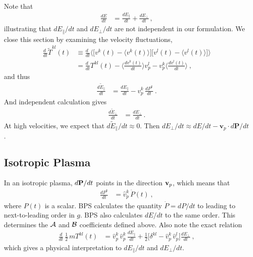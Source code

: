 \documentclass[preprint,12pt,eqsecnum,nofootinbib,amsmath,amssymb]{revtex4}
\begin{document}
Note that
\begin{align}
  \frac{d E}{dt} 
  &=\frac{d E_\parallel}{dt} + \frac{d E_\perp}{dt}
   \,,
\end{align}
illustrating that $dE_\parallel/dt$ and $dE_\perp/dt$ are
not independent in our formulation. 
We close this section by examining the velocity fluctuations,
\begin{align}
  \frac{d \,\,}{dt} \widetilde{T}^{kl}(t) 
  &\equiv
  \frac{d \,\,}{dt} \Big\langle \Big[v^k(t) - \langle v^k(t) \rangle \Big] 
  \Big[v^l(t) - \langle v^l(t) \rangle \Big] \Big\rangle 
  \nonumber\\
  &=
  \frac{d \,\,}{dt} T^{kl}(t) 
    - \Big\langle \frac{d v^k(t)}{dt} \Big\rangle v^l_p 
    -   v^k_p \Big\langle \frac{d v^l(t)}{dt} \Big\rangle 
\ ,
\end{align}
and thus
\begin{align}
\frac{d \widetilde{E}_\parallel}{dt} &= \frac{d E_\parallel}{dt} 
    - v^k_p\, \frac{d P^k}{dt} 
    \ .
\end{align}
And independent calculation gives
\begin{align} 
\frac{d \widetilde{E}_\perp}{dt} &= \frac{d E_\perp}{dt} \,.
\label{perp}
\end{align}
At high velocities, we expect that 
$d \widetilde{E}_\parallel / dt \approx 0$. Then
$d E_\perp / dt \approx dE/dt - \mathbf v_p \cdot d\mathbf P /dt$.


\subsection{Isotropic Plasma}

In an isotropic plasma, $d{\bf P}/dt$ points in the direction ${\bf v}_p$,
which means that
\begin{align}
\frac{d P^k}{dt}  &= \hat v^k_p\, \dot P(t) 
\ ,
\end{align}
where $P(t)$ is a scalar. BPS calculates the quantity $\dot P = dP/dt$ to
leading to next-to-leading order in $g$. BPS also calculates $dE/dt$ to
the same order. This determines the ${\cal A}$ and ${\cal B}$ coefficients
defined above. Also note the exact relation
\begin{align}
  \frac{d}{dt} \, \frac{1}{2}\, m T^{kl}(t) 
  &= 
  \hat v_p^k \,\hat v_p^k \, \frac{dE_\parallel}{dt} 
  + 
  \frac{1}{2} \Big[ \delta^{kl} - \hat v_p^k \, \hat v_p^l \Big] \frac{dE_\perp}{dt} 
  \ ,
\end{align}
which gives a physical interpretation to $dE_\parallel/dt$ and 
$dE_\perp/dt$. 
\end{document}
